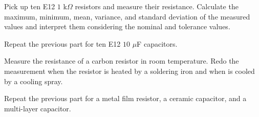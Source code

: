 \documentclass[11pt]{article}
\begin{document}

\begin{question}


    \begin{subquestion}{Pick up ten E12 $1$ k$\Omega$ resistors and measure their resistance. Calculate the maximum, minimum, mean, variance, and standard deviation of the measured values and interpret them considering the nominal and tolerance values. }
    \end{subquestion}

    \begin{subquestion}{Repeat the previous part for ten E12 $10$ $\mu$F capacitors. }
    \end{subquestion}

\end{question}


\begin{question}


    \begin{subquestion}{Measure the resistance of a carbon resistor in room temperature. Redo the measurement when the resistor is heated by a soldering iron and when is cooled by a cooling spray. }
        \answer{}
    \end{subquestion}

    \begin{subquestion}{Repeat the previous part for a metal film resistor, a ceramic capacitor, and a multi-layer capacitor. }
        \answer{}
    \end{subquestion}

\end{question}
\end{document}
